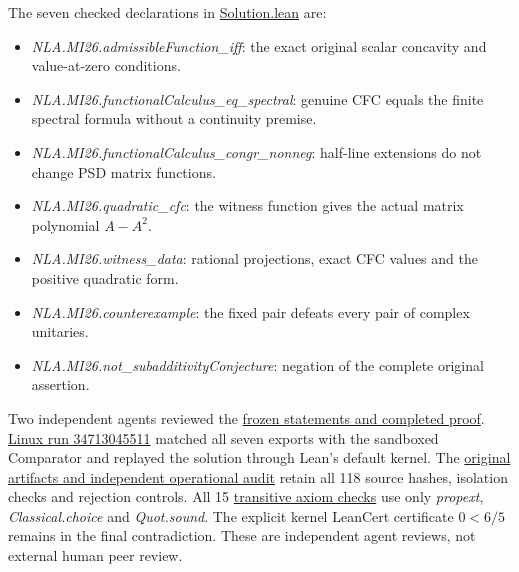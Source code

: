 \documentclass[11pt,a4paper]{article}
\providecommand{\tightlist}{\setlength{\itemsep}{0pt}\setlength{\parskip}{0pt}}
\begin{document}
The seven checked declarations in
\href{https://github.com/sgstepaniants/OpenProblemsInNLA/blob/81176af27e570b59ba1e1a0745e28944e7d57c03/matrix-inequalities-and-norms/MI-26/lean/Solution.lean}{Solution.lean}
are:

\begin{itemize}
\tightlist
\item
  \textit{NLA.MI26.admissibleFunction\_iff}: the exact original scalar
  concavity and value-at-zero conditions.
\item
  \textit{NLA.MI26.functionalCalculus\_eq\_spectral}: genuine CFC equals
  the finite spectral formula without a continuity premise.
\item
  \textit{NLA.MI26.functionalCalculus\_congr\_nonneg}: half-line
  extensions do not change PSD matrix functions.
\item
  \textit{NLA.MI26.quadratic\_cfc}: the witness function gives the
  actual matrix polynomial \(A-A^2\).
\item
  \textit{NLA.MI26.witness\_data}: rational projections, exact CFC
  values and the positive quadratic form.
\item
  \textit{NLA.MI26.counterexample}: the fixed pair defeats every pair of
  complex unitaries.
\item
  \textit{NLA.MI26.not\_subadditivityConjecture}: negation of the
  complete original assertion.
\end{itemize}

Two independent agents reviewed the
\href{https://github.com/ajt60gaibb/OpenProblemsInNLA/blob/main/matrix-inequalities-and-norms/MI-26/lean/reviews}{frozen
statements and completed proof}.
\href{https://github.com/sgstepaniants/OpenProblemsInNLA/actions/runs/34713045511}{Linux
run 34713045511} matched all seven exports with the sandboxed Comparator
and replayed the solution through Lean's default kernel. The
\href{https://github.com/ajt60gaibb/OpenProblemsInNLA/blob/main/matrix-inequalities-and-norms/MI-26/lean/verification/linux-2026-09-12}{original
artifacts and independent operational audit} retain all 118 source
hashes, isolation checks and rejection controls. All 15
\href{https://github.com/ajt60gaibb/OpenProblemsInNLA/blob/main/matrix-inequalities-and-norms/MI-26/lean/verification/proof-axioms.json}{transitive
axiom checks} use only \textit{propext}, \textit{Classical.choice} and
\textit{Quot.sound}. The explicit kernel LeanCert certificate \(0<6/5\)
remains in the final contradiction. These are independent agent reviews,
not external human peer review.
\end{document}
